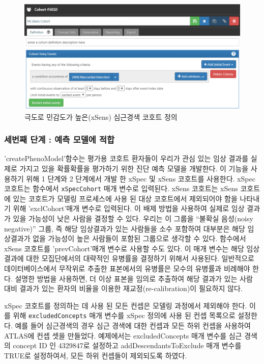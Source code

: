 \documentclass[11pt]{book}
\theoremstyle{definition}
\theoremstyle{definition}
\theoremstyle{definition}
\theoremstyle{remark}
\begin{document}
\begin{figure}

{\centering \includegraphics[width=1\linewidth]{images/ClinicalValidity/xSens} 

}

\caption{극도로 민감도가 높은(xSens) 심근경색 코호트 정의}\label{fig:xSens}
\end{figure}

\subsubsection*{세번째 단계 : 예측 모델에 적합}\label{----}

'createPhenoModel'함수는 평가용 코호트 환자들이 우리가 관심 있는 임상
결과를 실제로 가지고 있을 확률확률을 평가하기 위한 진단 예측 모델을
개발한다. 이 기능을 사용하기 위해 1 단계와 2 단계에서 개발 한 xSpec 및
xSens 코호트를 사용한다. xSpec 코호트는 함수에서 \texttt{xSpecCohort}
매개 변수로 입력된다. xSens 코호트는 xSens 코호트에 있는 코호트가 모델링
프로세스에 사용 된 대상 코호트에서 제외되어야 함을 나타내기 위해
'exclCohort'매개 변수로 입력된다. 이 배제 방법을 사용하여 실제로 임상
결과가 있을 가능성이 낮은 사람을 결정할 수 있다. 우리는 이 그룹을
``불확실 음성(noisy negative)'' 그룹, 즉 해당 임상결과가 있는 사람들을
소수 포함하여 대부분은 해당 임상결과가 없을 가능성이 높은 사람들이
포함된 그룹으로 생각할 수 있다. 함수에서 xSens 코호트를 'prevCohort'매개
변수로 사용할 수도 있다. 이 매개 변수는 해당 임상 결과에 대한
모집단에서의 대략적인 유병률을 결정하기 위해서 사용된다. 일반적으로
데이터베이스에서 무작위로 추출한 표본에서의 유병률은 모수의 유병률과
비례해야 한다. 설명한 방법을 사용하면, 더 이상 표본을 임의로 추출하여
해당 결과가 있는 사람 대비 결과가 있는 환자의 비율을 이용한
재교정(re-calibration)이 필요하지 않다.

xSpec 코호트를 정의하는 데 사용 된 모든 컨셉은 모델링 과정에서 제외해야
한다. 이를 위해 \texttt{excludedConcepts} 매개 변수를 xSpec 정의에 사용
된 컨셉 목록으로 설정한다. 예를 들어 심근경색의 경우 심근 경색에 대한
컨셉과 모든 하위 컨셉을 사용하여 ATLAS에 컨셉 셋을 만들었다. 예제에서는
excludedConcepts 매개 변수를 심근 경색의 concept ID 인 4329847로
설정하고 addDescendantsToExclude 매개 변수를 TRUE로 설정하여서, 모든
하위 컨셉들이 제외되도록 하였다.
\end{document}
